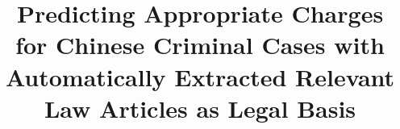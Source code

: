 \documentclass{article}
\title{Predicting Appropriate Charges for Chinese Criminal Cases with Automatically Extracted Relevant Law Articles as Legal Basis}
\begin{document}
\begin{CJK*}{UTF8}{gbsn}  

\maketitle









\clearpage



\end{CJK*}  
\end{document}

